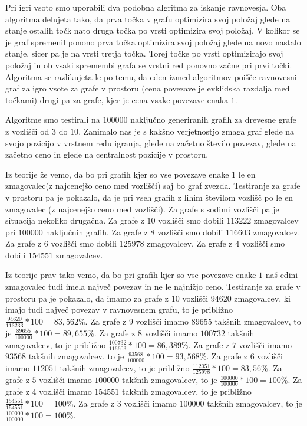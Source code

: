 \documentclass[fin1, tisk]{fmfdelo}
\begin{document}
Pri igri vsoto smo uporabili dva podobna algritma za iskanje ravnovesja.
Oba algoritma delujeta tako, da prva točka v grafu optimizira svoj položaj glede na stanje ostalih točk nato druga točka po vrsti optimizira svoj položaj.
V kolikor se je graf spremenil ponono prva točka optimizira svoj položaj glede na novo nastalo stanje, sicer pa je na vrsti tretja točka.
Torej točke po vrsti optimizirajo svoj položaj in ob vsaki spremembi grafa se vrstni red ponovno začne pri prvi točki.
Algoritma se razlikujeta le po temu, da eden izmed algoritmov poišče ravnovesni graf za igro vsote za grafe v prostoru
(cena povezave je evklidska razdalja med točkami) drugi pa za grafe, kjer je cena vsake povezave enaka $1$.

Algoritme smo testirali na $100000$ naključno generiranih grafih za drevesne grafe z vozlišči od $3$ do $10$.
Zanimalo nas je s kakšno verjetnostjo zmaga graf glede na svojo pozicijo v vrstnem redu igranja, glede na začetno število povezav,
glede na začetno ceno in glede na centralnost pozicije v prostoru.

Iz teorije že vemo, da bo pri grafih kjer so vse povezave enake $1$ le en zmagovalec(z najcenejšo ceno med vozlišči) saj bo graf zvezda.
Testiranje za grafe v prostoru pa je pokazalo, da je pri vseh grafih z lihim številom vozlišč po le en zmagovalec (z najcenejšo ceno med vozlišči).
Za grafe s sodimi vozlišči pa je situacija nekoliko drugačna. Za grafe z $10$ vozlišči smo dobili $113222$ zmagovalcev pri $100000$ naključnih grafih.
Za grafe z $8$ vozlišči smo dobili $116603$ zmagovalcev.
Za grafe z $6$ vozlišči smo dobili $125978$ zmagovalcev.
Za grafe z $4$ vozlišči smo dobili $154551$ zmagovalcev.

Iz teorije prav tako vemo, da bo pri grafih kjer so vse povezave enake $1$ naš edini zmagovalec tudi imela največ povezav in ne le najnižjo ceno.
Testiranje za grafe v prostoru pa je pokazalo, da imamo za grafe z $10$ vozlišči $94620$ zmagovalcev, ki imajo tudi največ povezav v ravnovesnem grafu, to je približno $\frac{94620}{113233}*100 = 83,562 \%$.
Za grafe z $9$ vozlišči imamo $89655$ takšnih zmagovalcev, to je $\frac{89655}{100000}*100 = 89,655 \%$.
Za grafe z $8$ vozlišči imamo $100732$ takšnih zmagovalcev, to je približno $\frac{100732}{116603}*100 = 86,389 \%$.
Za grafe z $7$ vozlišči imamo $93568$ takšnih zmagovalcev, to je $\frac{93568}{100000}*100 = 93,568 \%$.
Za grafe z $6$ vozlišči imamo $112051$ takšnih zmagovalcev, to je približno $\frac{112051}{125978}*100 = 83,56 \%$.
Za grafe z $5$ vozlišči imamo $100000$ takšnih zmagovalcev, to je $\frac{100000}{100000}*100 = 100 \%$.
Za grafe z $4$ vozlišči imamo $154551$ takšnih zmagovalcev, to je približno $\frac{154551}{154551}*100 = 100 \%$.
Za grafe z $3$ vozlišči imamo $100000$ takšnih zmagovalcev, to je $\frac{100000}{100000}*100 = 100 \%$.
\end{document}
